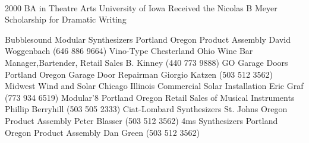 \documentclass[9pt]{developercv} %
\begin{document}
\hfill
\begin{minipage}[t]{0.475\textwidth} %
	\vspace{-\baselineskip} %
	
	\vspace{6pt}
	
    \\
	
\end{minipage}

\vspace{-5 pt}

\vspace{-10 pt}
\begin{entrylist}
    \entry
		{2000}
		{BA in Theatre Arts}
		{University of Iowa}
		{Received the Nicolas B Meyer Scholarship for Dramatic Writing}
\end{entrylist}

\begin{publist}
    \ralphjob{}
        {Bubblesound Modular Synthesizers}
        {Portland Oregon}
        {Product Assembly}
        {David Woggenbach (646 886 9664)}    
    \ralphjob{}
		{Vino-Type}
		{Chesterland Ohio}
		{Wine Bar Manager,Bartender, Retail Sales}
        {B. Kinney (440 773 9888)}
    \ralphjob{}
        {GO Garage Doors}
        {Portland Oregon}
        {Garage Door Repairman}
        {Giorgio Katzen (503 512 3562)}
    \ralphjob{}
        {Midwest Wind and Solar}
        {Chicago Illinois}
        {Commercial Solar Installation}
        {Eric Graf (773 934 6519)}
    \ralphjob{}
        {Modular'8}
        {Portland Oregon}
        {Retail Sales of Musical Instruments}
        {Phillip Berryhill (503 505 2333)}
    \ralphjob{}
        {Ciat-Lombard Synthesizers}
        {St. Johns Oregon}
        {Product Assembly}
        {Peter Blasser (503 512 3562)}
    \ralphjob{}
        {4ms Synthesizers}
        {Portland Oregon}
        {Product Assembly}
        {Dan Green (503 512 3562)}
\end{publist}
\end{document}
